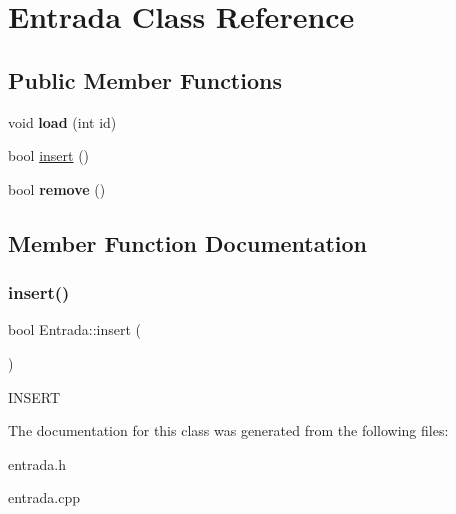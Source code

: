 \hypertarget{classEntrada}{}\section{Entrada Class Reference}
\label{classEntrada}
\subsection*{Public Member Functions}
\begin{DoxyCompactItemize}
\item 
\mbox{\label{classEntrada_a1b4cadcad1ba9665c73b3515eaad16cc}} 
void {\bfseries load} (int id)
\item 
bool \mbox{\hyperlink{classEntrada_af6ef4854f5d9040117278ffe65eac8a3}{insert}} ()
\item 
\mbox{\label{classEntrada_a352b5c6fad6fe043a06625c995b78e32}} 
bool {\bfseries remove} ()
\end{DoxyCompactItemize}


\subsection{Member Function Documentation}
\mbox{\label{classEntrada_af6ef4854f5d9040117278ffe65eac8a3}} 
\subsubsection{\texorpdfstring{insert()}{insert()}}
{\footnotesize\ttfamily bool Entrada\+::insert (\begin{DoxyParamCaption}{ }\end{DoxyParamCaption})}

I\+N\+S\+E\+RT 

The documentation for this class was generated from the following files\+:\begin{DoxyCompactItemize}
\item 
entrada.\+h\item 
entrada.\+cpp\end{DoxyCompactItemize}
